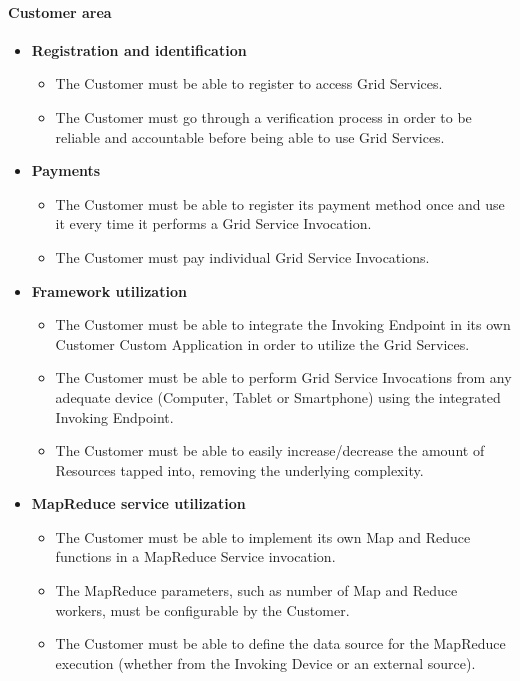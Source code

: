 \paragraph{Customer area}
\begin{itemize}
    \item \textbf{Registration and identification}
    \begin{itemize}
        \item The Customer must be able to register to access Grid Services.
        \item The Customer must go through a verification process in order to be reliable and accountable before being able to use Grid Services.
    \end{itemize}
    \item \textbf{Payments}
    \begin{itemize}
        \item The Customer must be able to register its payment method once and use it every time it performs a Grid Service Invocation.
        \item The Customer must pay individual Grid Service Invocations.
    \end{itemize}
    \item \textbf{Framework utilization}
    \begin{itemize}
        \item The Customer must be able to integrate the Invoking Endpoint in its own Customer Custom Application in order to utilize the Grid Services.
        \item The Customer must be able to perform Grid Service Invocations from any adequate device (Computer, Tablet or Smartphone) using the integrated Invoking Endpoint.
        \item The Customer must be able to easily increase/decrease the amount of Resources tapped into, removing the underlying complexity.
    \end{itemize}
    \item \textbf{MapReduce service utilization}
    \begin{itemize}
        \item The Customer must be able to implement its own Map and Reduce functions in a MapReduce Service invocation.
        \item The MapReduce parameters, such as number of Map and Reduce workers, must be configurable by the Customer.
        \item The Customer must be able to define the data source for the MapReduce execution (whether from the Invoking Device or an external source).
    \end{itemize}
\end{itemize}
\vspace{10mm}
